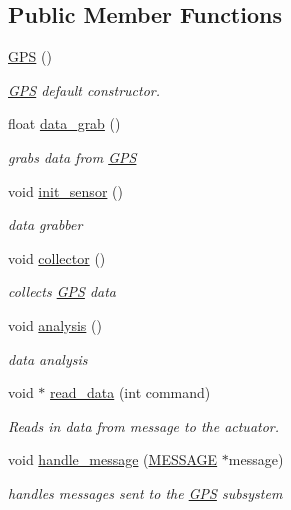 \subsection*{Public Member Functions}
\begin{DoxyCompactItemize}
\item 
\hyperlink{classGPS_a0c347a188512d0d5cf7ed5c91b145fc4}{G\-P\-S} ()
\begin{DoxyCompactList}\small\item\em \hyperlink{classGPS}{G\-P\-S} default constructor. \end{DoxyCompactList}\item 
float \hyperlink{classGPS_a2276d26044fb15e498c52b4ee5bcaa91}{data\-\_\-grab} ()
\begin{DoxyCompactList}\small\item\em grabs data from \hyperlink{classGPS}{G\-P\-S} \end{DoxyCompactList}\item 
void \hyperlink{classGPS_aebb999362899800a7e372e873bb5b943}{init\-\_\-sensor} ()
\begin{DoxyCompactList}\small\item\em data grabber \end{DoxyCompactList}\item 
void \hyperlink{classGPS_a17383568c4ed86a0adfdd5c88b6591d4}{collector} ()
\begin{DoxyCompactList}\small\item\em collects \hyperlink{classGPS}{G\-P\-S} data \end{DoxyCompactList}\item 
void \hyperlink{classGPS_a4dca50736c5e49f831515219536823b2}{analysis} ()
\begin{DoxyCompactList}\small\item\em data analysis \end{DoxyCompactList}\item 
void $\ast$ \hyperlink{classGPS_aa04076536ee9f7e2679895c69b07ad58}{read\-\_\-data} (int command)
\begin{DoxyCompactList}\small\item\em Reads in data from message to the actuator. \end{DoxyCompactList}\item 
\hypertarget{classGPS_a803a498352e30044136502a9e036d380}{void \hyperlink{classGPS_a803a498352e30044136502a9e036d380}{handle\-\_\-message} (\hyperlink{SUBSYS__COMMANDS_8h_ad814416fc1a8c675bea2687d96088a8f}{M\-E\-S\-S\-A\-G\-E} $\ast$message)}\label{classGPS_a803a498352e30044136502a9e036d380}

\begin{DoxyCompactList}\small\item\em handles messages sent to the \hyperlink{classGPS}{G\-P\-S} subsystem \end{DoxyCompactList}\end{DoxyCompactItemize}
